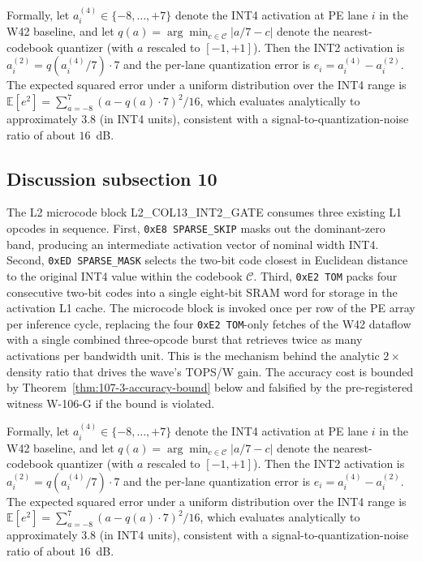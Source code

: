 Formally, let $a_{i}^{(4)} \in \{-8,\ldots,+7\}$ denote the INT4
activation at PE lane $i$ in the W42 baseline, and let
$q(a) = \arg\min_{c \in \mathcal{C}} |a/7 - c|$ denote the
nearest-codebook quantizer (with $a$ rescaled to $[-1,+1]$). Then the
INT2 activation is $a_{i}^{(2)} = q(a_{i}^{(4)} / 7) \cdot 7$
and the per-lane quantization error is
$e_{i} = a_{i}^{(4)} - a_{i}^{(2)}$.
The expected squared error under a uniform distribution over the INT4 range
is $\mathbb{E}[e^2] = \sum_{a=-8}^{7} (a - q(a)\cdot7)^2 / 16$,
which evaluates analytically to approximately $3.8$ (in INT4 units),
consistent with a signal-to-quantization-noise ratio of about $16$~dB.


\subsection{Discussion subsection 10}

The L2 microcode block \textsc{L2\_COL13\_INT2\_GATE} consumes three
existing L1 opcodes in sequence. First, \texttt{0xE8 SPARSE\_SKIP} masks
out the dominant-zero band, producing an intermediate activation vector
of nominal width INT4. Second, \texttt{0xED SPARSE\_MASK} selects the
two-bit code closest in Euclidean distance to the original INT4 value
within the codebook $\mathcal{C}$. Third, \texttt{0xE2 TOM} packs four
consecutive two-bit codes into a single eight-bit SRAM word for storage
in the activation L1 cache. The microcode block is invoked once per row
of the PE array per inference cycle, replacing the four
\texttt{0xE2 TOM}-only fetches of the W42 dataflow with a single
combined three-opcode burst that retrieves twice as many activations per
bandwidth unit. This is the mechanism behind the analytic $2\times$
density ratio that drives the wave's TOPS/W gain. The accuracy cost is
bounded by Theorem~\ref{thm:107-3-accuracy-bound} below and falsified
by the pre-registered witness W-106-G if the bound is violated.

Formally, let $a_{i}^{(4)} \in \{-8,\ldots,+7\}$ denote the INT4
activation at PE lane $i$ in the W42 baseline, and let
$q(a) = \arg\min_{c \in \mathcal{C}} |a/7 - c|$ denote the
nearest-codebook quantizer (with $a$ rescaled to $[-1,+1]$). Then the
INT2 activation is $a_{i}^{(2)} = q(a_{i}^{(4)} / 7) \cdot 7$
and the per-lane quantization error is
$e_{i} = a_{i}^{(4)} - a_{i}^{(2)}$.
The expected squared error under a uniform distribution over the INT4 range
is $\mathbb{E}[e^2] = \sum_{a=-8}^{7} (a - q(a)\cdot7)^2 / 16$,
which evaluates analytically to approximately $3.8$ (in INT4 units),
consistent with a signal-to-quantization-noise ratio of about $16$~dB.


